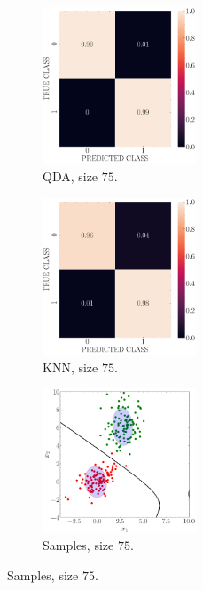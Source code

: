 \documentclass[12pt, a4 paper]{article}
\begin{document}
\begin{figure}[!htbp]
\quad \quad 
    \begin{subfigure}[!htbp]{0.24\textwidth}
       \centering
       \includegraphics[width=1.8in]{../results/ex1/conf_mtx_QD_ML_dataset_P1c_size_75.pdf}
       \caption{QDA, size $75$.}
       \label{fig:KNN_P1c_75}
    \end{subfigure}
\quad \quad
    \begin{subfigure}[!htbp]{0.24\textwidth}
       \centering
       \includegraphics[width=1.8in]{../results/ex1/conf_mtx_KNN_dataset_P1c_size_75.pdf}
       \caption{KNN, size $75$.}
       \label{fig:KNN_P1c_75}
    \end{subfigure}
\quad \quad
    \begin{subfigure}[!htbp]{0.24\textwidth}
       \centering
       \includegraphics[width=1.8in]{../results/ex1/samples_QD_ML_dataset_P1c_size_75.pdf}
       \caption{Samples, size $75$.}
       \label{fig:KNN_P1c_75}
    \end{subfigure}
    

\end{figure}
\end{document}
